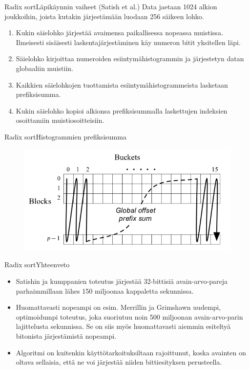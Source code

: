 \documentclass{beamer}
\begin{document}
\begin{frame}{Radix sort}{Läpikäynnin vaiheet (Satish et al.)}
Data jaetaan 1024 alkion joukkoihin, joista kutakin järjestämään luodaan 256 säikeen lohko.
\begin{enumerate}
  \item
    Kukin säielohko järjestää avaimensa paikallisessa nopeassa muistissa. Ilmeisesti sisäisesti laskentajärjestäminen käy numeron bitit yksitellen läpi.
  \item
    Säielohko kirjoittaa numeroiden esiintymähistogrammin ja järjestetyn datan globaaliin muistiin.
  \item
    Kaikkien säielohkojen tuottamista esiintymähistogrammeista lasketaan prefiksisumma.
  \item
    Kukin säielohko kopioi alkionsa prefiksisummalla laskettujen indeksien osoittamiin muistiosoitteisiin.
\end{enumerate}
\end{frame}

\begin{frame}{Radix sort}{Histogrammien prefiksisumma}
\begin{figure}
    \includegraphics[scale=0.4]{prefixsum.png}
\end{figure}
\end{frame}

\begin{frame}{Radix sort}{Yhteenveto}
\begin{itemize}
    \item
      Satishin ja kumppanien toteutus järjestää 32-bittisiä avain-arvo-pareja parhaimmillaan lähes 150 miljoonaa kappaletta sekunnissa.
    \item
      Huomattavasti nopeampi on esim. Merrillin ja Grimshawn uudempi, optimoidumpi toteutus, joka suoriutuu noin 500 miljoonan avain-arvo-parin lajittelusta sekunnissa. Se on siis myös huomattavasti aiemmin esiteltyä bitonista järjestämistä nopeampi.
    \item
      Algoritmi on kuitenkin käyttötarkoituksiltaan rajoittunut, koska avainten on oltava sellaisia, että ne voi järjestää niiden bittiesityksen perusteella.
\end{itemize}
\end{frame}
\end{document}

